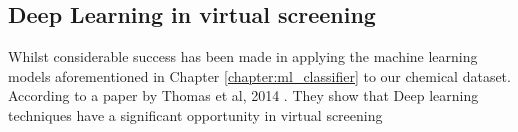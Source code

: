 \documentclass[a4paper,12pt]{report}
\begin{document}
		\subsection{Deep Learning in virtual screening}
		Whilst considerable success has been made in applying the machine learning models aforementioned in Chapter \ref{chapter:ml_classifier} to our chemical dataset. According to a paper by Thomas et al, 2014 \cite{Thomasetal2014}. They show 
		that Deep learning techniques have a significant opportunity in virtual screening






\end{document}

